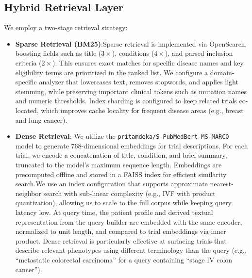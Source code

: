 \documentclass[11pt]{article}
\begin{document}
\subsection{Hybrid Retrieval Layer}
We employ a two-stage retrieval strategy:
\begin{itemize}
    \item \textbf{Sparse Retrieval (BM25)}:Sparse retrieval is implemented via OpenSearch, boosting fields such as title ($3\times$), conditions ($4\times$), and parsed inclusion criteria ($2\times$). This ensures exact matches for specific disease names and key eligibility terms are prioritized in the ranked list. We configure a domain-specific analyzer that lowercases text, removes stopwords, and applies light stemming, while preserving important clinical tokens such as mutation names and numeric thresholds. Index sharding is configured to keep related trials co-located, which improves cache locality for frequent disease areas (e.g., breast and lung cancer).

    \item \textbf{Dense Retrieval}: We utilize the \texttt{pritamdeka/S-PubMedBert-MS-MARCO} model to generate 768-dimensional embeddings for trial descriptions. For each trial, we encode a concatenation of title, condition, and brief summary, truncated to the model’s maximum sequence length. Embeddings are precomputed offline and stored in a FAISS index for efficient similarity search.We use an index configuration that supports approximate nearest-neighbor search with sub-linear complexity (e.g., IVF with product quantization), allowing us to scale to the full corpus while keeping query latency low. At query time, the patient profile and derived textual representation from the query builder are embedded with the same encoder, normalized to unit length, and compared to trial embeddings via inner product. Dense retrieval is particularly effective at surfacing trials that describe relevant phenotypes using different terminology than the query (e.g., “metastatic colorectal carcinoma” for a query containing “stage IV colon cancer”).\\
\end{itemize}
\end{document}
